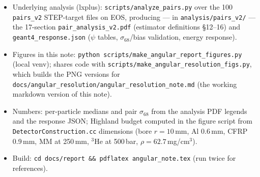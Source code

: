 \documentclass[11pt,a4paper]{article}
\newcommand{\He}[1]{$^{#1}$He}
\newcommand{\sig}[1]{\sigma_{68}^{#1}}
\begin{document}
\begin{itemize}
\item Underlying analysis (lxplus): \texttt{scripts/analyze\_pairs.py} over
  the 100 \texttt{pairs\_v2} STEP-target files on EOS, producing --- in
  \texttt{analysis/pairs\_v2/} --- the 17-section
  \texttt{pair\_analysis\_v2.pdf} (estimator definitions \S12--16) and
  \texttt{geant4\_response.json} ($\psi$ tables, $\sig{}$/bias validation,
  energy response).
\item Figures in this note:
  \texttt{python scripts/make\_angular\_report\_figures.py} (local venv);
  shares code with \texttt{scripts/make\_angular\_resolution\_figs.py},
  which builds the PNG versions for
  \texttt{docs/angular\_resolution/angular\_resolution\_note.md} (the
  working markdown version of this note).
\item Numbers: per-particle medians and pair $\sig{}$ from the analysis PDF
  legends and the response JSON; Highland budget computed in the figure
  script from \texttt{DetectorConstruction.cc} dimensions (bore $r=10$\,mm,
  Al 0.6\,mm, CFRP 0.9\,mm, MM at 250\,mm, \He{3} at 500\,bar,
  $\rho = 62.7$\,mg/cm$^3$).
\item Build: \texttt{cd docs/report \&\& pdflatex angular\_note.tex} (run
  twice for references).
\end{itemize}
\end{document}
